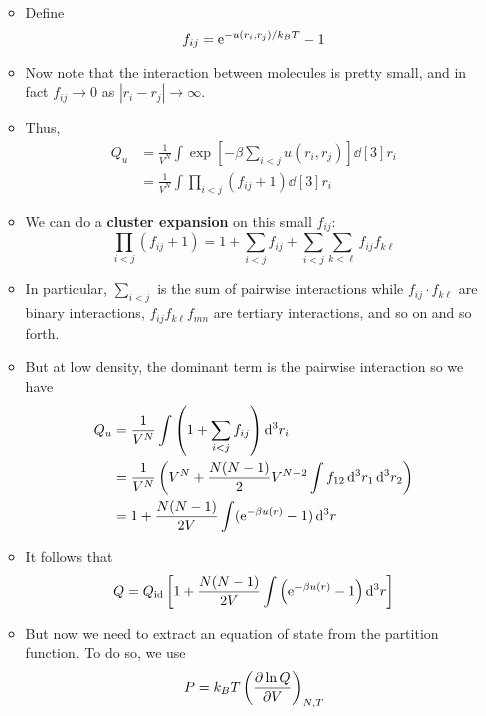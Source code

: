 \documentclass[../notes.tex]{subfiles}
\begin{document}
\begin{itemize}
\begin{itemize}
\begin{align*}
        \end{align*}
        \item Define
        \begin{equation*}
            f_{ij} = \e[-u(r_i,r_j)/k_BT]-1
        \end{equation*}
        \item Now note that the interaction between molecules is pretty small, and in fact $f_{ij}\to 0$ as $|r_i-r_j|\to\infty$.
        \item Thus,
        \begin{align*}
            Q_u &= \frac{1}{V^N}\int\exp\left[ -\beta\sum_{i<j}u(r_i,r_j) \right]\dd[3]{r_i}\\
            &= \frac{1}{V^N}\int\prod_{i<j}(f_{ij}+1)\dd[3]{r_i}
        \end{align*}
        \item We can do a \textbf{cluster expansion} on this small $f_{ij}$:
        \begin{equation*}
            \prod_{i<j}(f_{ij}+1) = 1+\sum_{i<j}f_{ij}+\sum_{i<j}\sum_{k<\ell}f_{ij}f_{k\ell}
        \end{equation*}
        \item In particular, $\sum_{i<j}$ is the sum of pairwise interactions while $f_{ij}\cdot f_{k\ell}$ are binary interactions, $f_{ij}f_{k\ell}f_{mn}$ are tertiary interactions, and so on and so forth.
        \item But at low density, the dominant term is the pairwise interaction so we have
        \begin{align*}
            Q_u &= \frac{1}{V^N}\int\left( 1+\sum_{i<j}f_{ij} \right)\dd[3]{r_i}\\
            &= \frac{1}{V^N}\left( V^N+\frac{N(N-1)}{2}V^{N-2}\int f_{12}\dd[3]{r_1}\dd[3]{r_2} \right)\\
            &= 1+\frac{N(N-1)}{2V}\int(\e[-\beta u(r)]-1)\dd[3]{r}
        \end{align*}
        \item It follows that
        \begin{equation*}
            Q = Q_\text{id}\left[ 1+\frac{N(N-1)}{2V}\int\left( \e[-\beta u(r)]-1 \right)\dd[3]{r} \right]
        \end{equation*}
        \item But now we need to extract an equation of state from the partition function. To do so, we use
        \begin{align*}
            P &= k_BT\left( \pdv{\ln Q}{V} \right)_{N,T}\\

\end{align*}
\end{itemize}
\end{itemize}
\end{document}
